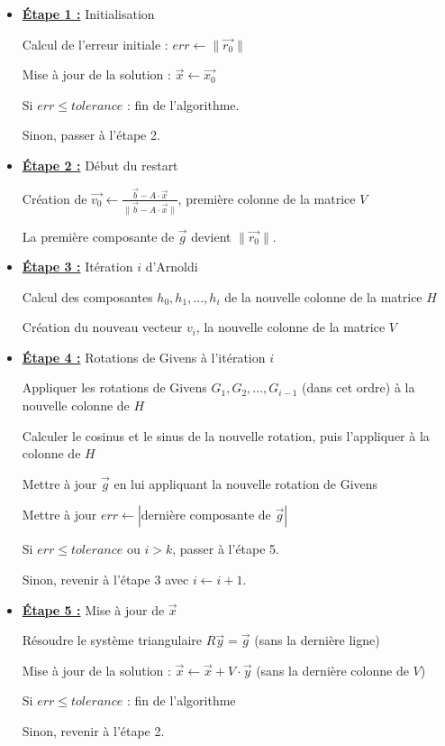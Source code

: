 \documentclass[11pt,a4paper,oneside]{memoir}
\theoremstyle{definition}
\theoremstyle{remark}
\theoremstyle{plain}
\begin{document}
\begin{itemize}
\item \underline{\textbf{\'Etape 1 :}} Initialisation

Calcul de l'erreur initiale : $err \leftarrow \lVert \vec{r_0} \rVert$

Mise à jour de la solution : $\vec{x} \leftarrow \vec{x_0}$\medskip

Si $err \leq tolerance$ : fin de l'algorithme.

Sinon, passer à l'étape 2.\medskip

\item \underline{\textbf{\'Etape 2 :}} Début du restart

Création de $\vec{v_0} \leftarrow \frac{\vec{b} - A\cdot \vec{x}}{\lVert \vec{b} - A\cdot \vec{x} \rVert}$, première colonne de la matrice $V$

La première composante de $\vec{g}$ devient $\lVert \vec{r_0} \rVert$.\medskip

\item \underline{\textbf{\'Etape 3 :}} Itération $i$ d'Arnoldi

Calcul des composantes $h_0, h_1, ..., h_i$ de la nouvelle colonne de la matrice $H$

Création du nouveau vecteur $v_i$, la nouvelle colonne de la matrice $V$\medskip

\item \underline{\textbf{\'Etape 4 :}} Rotations de Givens à l'itération $i$

Appliquer les rotations de Givens $G_1, G_2, ..., G_{i-1}$ (dans cet ordre) à la nouvelle colonne de $H$

Calculer le cosinus et le sinus de la nouvelle rotation, puis l'appliquer à la colonne de $H$

Mettre à jour $\vec{g}$ en lui appliquant la nouvelle rotation de Givens

Mettre à jour $err \leftarrow | \text{dernière composante de } \vec{g} |$\medskip

Si $err \leq tolerance$ ou $i > k$, passer à l'étape 5.

Sinon, revenir à l'étape 3 avec $i \leftarrow i+1$.\medskip

\item \underline{\textbf{\'Etape 5 :}} Mise à jour de $\vec{x}$

Résoudre le système triangulaire $R \vec{y} = \vec{g}$ (sans la dernière ligne)

Mise à jour de la solution : $\vec{x} \leftarrow \vec{x} + V \cdot \vec{y}$ (sans la dernière colonne de $V$)\medskip

Si $err \leq tolerance$ : fin de l'algorithme

Sinon, revenir à l'étape 2.
\end{itemize}\bigskip
\end{document}
